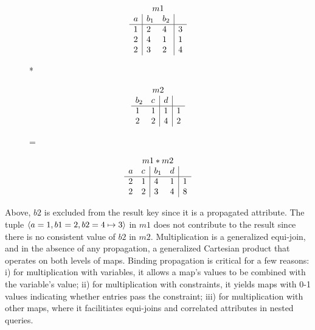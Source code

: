 {\vspace{-4mm}
\begin{figure}[h]
\begin{minipage}{1in}
\[
\begin{array}{l|ll|l}
\multicolumn{4}{c}{m1}\\
 a & b_1 & b_2 & \\
\hline
 1 & 2 & 4 & 3 \\
 2 & 4 & 1 & 1 \\
 2 & 3 & 2 & 4
\end{array}
\]
\end{minipage}
*
\begin{minipage}{0.85in}
\[
\begin{array}{ll|l|l}
\multicolumn{4}{c}{m2}\\
 b_2 & c & d & \\
\hline
 1 & 1 & 1 & 1 \\
 2 & 2 & 4 & 2 \\
\end{array}
\]
\end{minipage}
=
\begin{minipage}{1in}
\[
\begin{array}{ll|ll|l}
\multicolumn{5}{c}{m1 * m2}\\
 a & c & b_1 & d & \\
\hline
 2 & 1 & 4 & 1 & 1 \\
 2 & 2 & 3 & 4 & 8 \\
\end{array}
\]
\end{minipage}
\end{figure}

\vspace{-3mm}
\noindent Above, $b2$ is excluded from the result key since it is a propagated
attribute. The tuple ${\langle a=1,b1=2,b2=4 \mapsto 3\rangle}$ in $m1$ does not
contribute to the result since there is no consistent value of $b2$ in $m2$.
Multiplication is a generalized equi-join, and in the absence of any
propagation, a generalized Cartesian product that operates on both levels of
maps.
Binding propagation is critical for a few reasons: i) for
multiplication with variables, it allows a map's values to be combined with the
variable's value; ii) for multiplication with constraints, it yields maps
with 0-1 values indicating whether entries pass the constraint; iii) for
multiplication with other maps, where it facilitiates equi-joins and correlated
attributes in nested queries.


}
